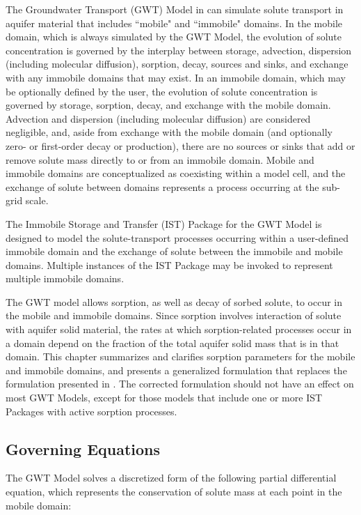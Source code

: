 
The Groundwater Transport (GWT) Model \citep{modflow6gwt} in \mf can simulate solute transport in aquifer material that includes ``mobile" and ``immobile" domains. In the mobile domain, which is always simulated by the GWT Model, the evolution of solute concentration is governed by the interplay between storage, advection, dispersion (including molecular diffusion), sorption, decay, sources and sinks, and exchange with any immobile domains that may exist. In an immobile domain, which may be optionally defined by the user, the evolution of solute concentration is governed by storage, sorption, decay, and exchange with the mobile domain. Advection and dispersion (including molecular diffusion) are considered negligible, and, aside from exchange with the mobile domain (and optionally zero- or first-order decay or production), there are no sources or sinks that add or remove solute mass directly to or from an immobile domain. Mobile and immobile domains are conceptualized as coexisting within a model cell, and the exchange of solute between domains represents a process occurring at the sub-grid scale.

The Immobile Storage and Transfer (IST) Package \citep{modflow6gwt} for the GWT Model is designed to model the solute-transport processes occurring within a user-defined immobile domain and the exchange of solute between the immobile and mobile domains. Multiple instances of the IST Package may be invoked to represent multiple immobile domains.

The GWT model allows sorption, as well as decay of sorbed solute, to occur in the mobile and immobile domains. Since sorption involves interaction of solute with aquifer solid material, the rates at which sorption-related processes occur in a domain depend on the fraction of the total aquifer solid mass that is in that domain. This chapter summarizes and clarifies sorption parameters for the mobile and immobile domains, and presents a generalized formulation that replaces the formulation presented in \cite{modflow6gwt}.  The corrected formulation should not have an effect on most GWT Models, except for those models that include one or more IST Packages with active sorption processes.

\subsection{Governing Equations} \label{sec:goveqn1}

The GWT Model \citep{modflow6gwt} solves a discretized form of the following partial differential equation, which represents the conservation of solute mass at each point in the mobile domain:

